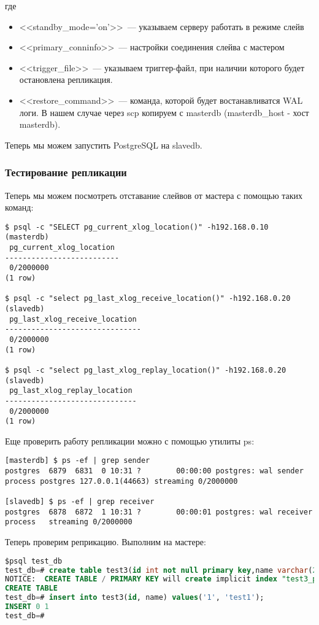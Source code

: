 где
\begin{itemize}
\item <<standby\_mode='on'>>~--- указываем серверу работать в режиме слейв
\item <<primary\_conninfo>>~--- настройки соединения слейва с мастером
\item <<trigger\_file>>~--- указываем триггер-файл, при наличии которого будет остановлена репликация.
\item <<restore\_command>>~--- команда, которой будет востанавливатся WAL логи. В нашем случае через 
scp копируем с masterdb (masterdb\_host - хост masterdb).
\end{itemize}

Теперь мы можем запустить PostgreSQL на slavedb.

\subsubsection{Тестирование репликации}
Теперь мы можем посмотреть отставание слейвов от мастера с помощью таких команд:
\begin{lstlisting}[label=lst:streaming15,caption=Тестирование репликации]
$ psql -c "SELECT pg_current_xlog_location()" -h192.168.0.10 (masterdb)
 pg_current_xlog_location 
--------------------------
 0/2000000
(1 row)

$ psql -c "select pg_last_xlog_receive_location()" -h192.168.0.20 (slavedb)
 pg_last_xlog_receive_location 
-------------------------------
 0/2000000
(1 row)

$ psql -c "select pg_last_xlog_replay_location()" -h192.168.0.20 (slavedb)
 pg_last_xlog_replay_location 
------------------------------
 0/2000000
(1 row)
\end{lstlisting}

Еще проверить работу репликации можно с помощью утилиты ps:
\begin{lstlisting}[label=lst:streaming16,caption=Тестирование репликации]
[masterdb] $ ps -ef | grep sender
postgres  6879  6831  0 10:31 ?        00:00:00 postgres: wal sender process postgres 127.0.0.1(44663) streaming 0/2000000

[slavedb] $ ps -ef | grep receiver
postgres  6878  6872  1 10:31 ?        00:00:01 postgres: wal receiver process   streaming 0/2000000
\end{lstlisting}

Теперь проверим реприкацию. Выполним на мастере:
\begin{lstlisting}[language=SQL,label=lst:streaming17,caption=Выполняем на мастере]
$psql test_db
test_db=# create table test3(id int not null primary key,name varchar(20));
NOTICE:  CREATE TABLE / PRIMARY KEY will create implicit index "test3_pkey" for table "test3"
CREATE TABLE
test_db=# insert into test3(id, name) values('1', 'test1');
INSERT 0 1
test_db=#
\end{lstlisting}

